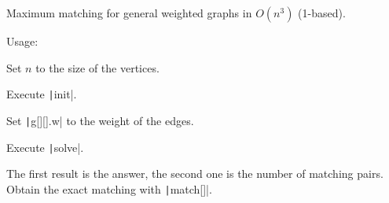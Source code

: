 Maximum matching for general weighted graphs in $O(n^3)$ (1-based).

Usage: 
\begin{compactenum}
\item Set $n$ to the size of the vertices.
\item Execute \texttt|init|.
\item Set \texttt|g[][].w| to the weight of the edges.
\item Execute \texttt|solve|.
\item The first result is the answer, the second one is the number of matching pairs. Obtain the exact matching with \texttt|match[]|.
\end{compactenum}

\inputminted{cpp}{src/graph/matching/blossom-algorithm-weighted.cpp.com}

